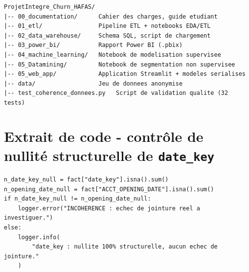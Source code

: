 \documentclass[11pt,a4paper]{report}
\begin{document}
\begin{Verbatim}[fontsize=\small, frame=single, framesep=3mm]
ProjetIntegre_Churn_HAFAS/
|-- 00_documentation/      Cahier des charges, guide etudiant
|-- 01_etl/                Pipeline ETL + notebooks EDA/ETL
|-- 02_data_warehouse/     Schema SQL, script de chargement
|-- 03_power_bi/           Rapport Power BI (.pbix)
|-- 04_machine_learning/   Notebook de modelisation supervisee
|-- 05_Datamining/         Notebook de segmentation non supervisee
|-- 05_web_app/            Application Streamlit + modeles serialises
|-- data/                  Jeu de donnees anonymise
|-- test_coherence_donnees.py   Script de validation qualite (32 tests)
\end{Verbatim}

\section{Extrait de code - contr\^ole de nullit\'e structurelle de \texttt{date\_key}}

\begin{Verbatim}[fontsize=\small, frame=single, framesep=3mm]
n_date_key_null = fact["date_key"].isna().sum()
n_opening_date_null = fact["ACCT_OPENING_DATE"].isna().sum()
if n_date_key_null != n_opening_date_null:
    logger.error("INCOHERENCE : echec de jointure reel a investiguer.")
else:
    logger.info(
        "date_key : nullite 100% structurelle, aucun echec de jointure."
    )
\end{Verbatim}
\end{document}
